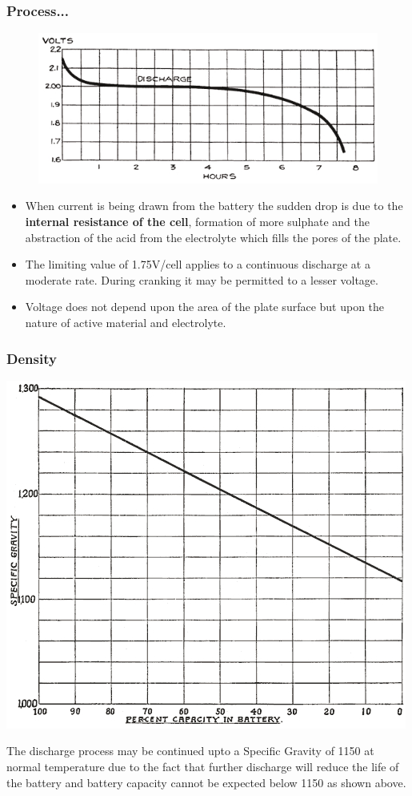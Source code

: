 \documentclass{beamer}
\begin{document}
  \begin{frame}    %
  \frametitle{Process...}
  \fontsize{9pt}{14}\selectfont
    \vspace{-20pt}
    \begin{figure}
      \includegraphics[width=0.7\linewidth]{./Resources/Images/voltage_during_discharge.jpg}
    \end{figure}
    \vspace{-20pt}
    
    \begin{itemize}
      \item When current is being drawn from the battery the sudden drop is due to the \textbf{internal resistance of the cell},
      formation of more sulphate and the abstraction of the acid from the electrolyte which fills the pores of the plate.
      \item The limiting value of 1.75V/cell applies to a continuous discharge at a moderate rate. During cranking it may be 
      permitted to a lesser voltage.
      \item Voltage does not depend upon the area of the plate surface but upon the nature of active material and electrolyte.
    \end{itemize}    
  \end{frame}

  \begin{frame}   %
  \frametitle{Density}
    \vspace{-10pt}
    \begin{center}
      \includegraphics[width=0.5\linewidth]{./Resources/Images/density_during_discharge.jpg}
    \end{center}
    The discharge process may be continued upto a Specific Gravity of 1150 at normal temperature due to the fact that
    further discharge will reduce the life of the battery and battery capacity cannot be expected below 1150 as shown above.
  \end{frame}
  
\end{document}
